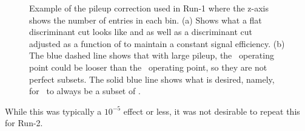 \begin{figure}[h]
\begin{subfigure}[b]{0.49\textwidth}
      \caption{}
      \label{fig:egamma:subset}
    \end{subfigure}
    \caption[Example of the pileup correction used in Run-1 where the z-axis shows the number of entries in each bin.]{Example of the pileup correction used in Run-1 where the z-axis shows the number of entries in each bin. 
    (a) Shows what a flat discriminant cut looks like and as well as a discriminant cut adjusted as a function of \nvtx to maintain a constant signal efficiency.
    (b) The blue dashed line shows that with large pileup, the \Medium\ operating point could be looser than the \Loose\ operating point, so they are not perfect subsets.
    The solid blue line shows what is desired, namely, for \Medium\ to always be a subset of \Loose.}
    \label{fig:egamma:pile-up}
\end{figure}
While this was typically a $10^{-5}$ effect or less, it was not desirable to repeat this for Run-2.

